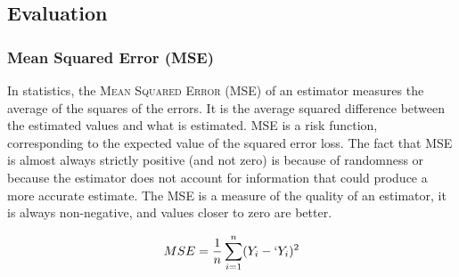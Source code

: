 \documentclass[12pt]{article}
\begin{document}
		\subsection{Evaluation}
			\subsubsection{Mean Squared Error (MSE)}
				In statistics, the \textsc{Mean Squared Error} (MSE) of an estimator measures the average of the squares of the errors. It is the average squared difference between the estimated values and what is estimated. MSE is a risk function, corresponding to the expected value of the squared error loss. The fact that MSE is almost always strictly positive (and not zero) is because of randomness or because the estimator does not account for information that could produce a more accurate estimate. The MSE is a measure of the quality of an estimator, it is always non-negative, and values closer to zero are better.
				
				$$ MSE = \frac{1}{n}\sum_{i = 1}^{n}(Y_i - `Y_i)^2$$
				
\end{document}
